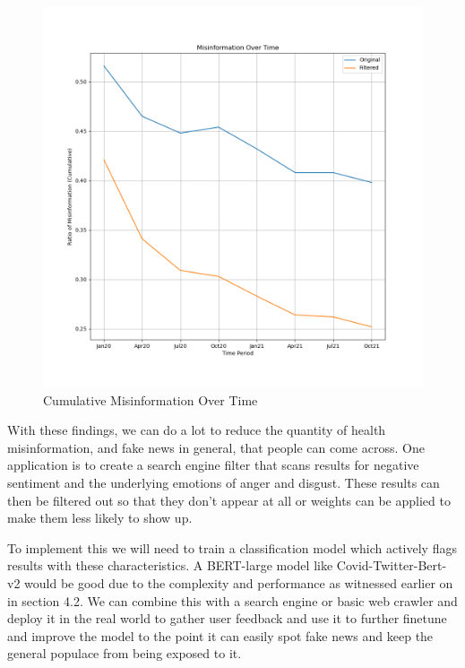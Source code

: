 \documentclass{l4proj}
\begin{document}
\begin{figure}[H]
    \centering
    \includegraphics[width=1.0\linewidth]{images/misinfoPlotv2.png}
    \caption{Cumulative Misinformation Over Time}
    \label{fig:overall}
\end{figure}

With these findings, we can do a lot to reduce the quantity of health misinformation, and fake news in general, that people can come across. One application is to create a search engine filter that scans results for negative sentiment and the underlying emotions of anger and disgust. These results can then be filtered out so that they don't appear at all or weights can be applied to make them less likely to show up.

To implement this we will need to train a classification model which actively flags results with these characteristics. A BERT-large model like Covid-Twitter-Bert-v2 would be good due to the complexity and performance as witnessed earlier on in section 4.2. We can combine this with a search engine or basic web crawler and deploy it in the real world to gather user feedback and use it to further finetune and improve the model to the point it can easily spot fake news and keep the general populace from being exposed to it.

\end{document}
